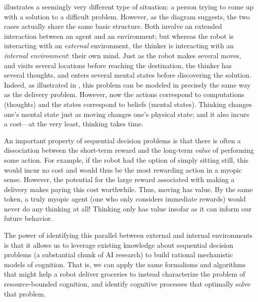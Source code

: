  illustrates a seemingly very different type of situation: a person trying to come up with a solution to a difficult problem. However, as the diagram suggests, the two cases actually share the same basic structure. Both involve an extended interaction between an agent and an environment; but whereas the robot is interacting with an \emph{external} environment, the thinker is interacting with an \emph{internal environment}: their own mind. Just as the robot makes several moves, and visits several locations before reaching the destination, the thinker has several thoughts, and enters several mental states before discovering the solution. Indeed, as illustrated in , this problem can be modeled in precisely the same way as the delivery problem. However, now the actions correspond to computations (thoughts) and the states correspond to beliefs (mental states). Thinking changes one's mental state just as moving changes one's physical state; and it also incurs a cost---at the very least, thinking takes time.

An important property of sequential decision problems is that there is often a dissociation between the short-term reward and the long-term \emph{value} of performing some action. For example, if the robot had the option of simply sitting still, this would incur no cost and would thus be the most rewarding action in a myopic sense. However, the potential for the large reward associated with making a delivery makes paying this cost worthwhile. Thus, moving has value. By the same token, a truly myopic agent (one who only considers immediate rewards) would never do any thinking at all! Thinking only has value insofar as it can inform our future behavior.\footnotemark{}


The power of identifying this parallel between external and internal environments is that it allows us to leverage existing knowledge about sequential decision problems (a substantial chunk of AI research) to build rational mechanistic models of cognition. That is, we can apply the same formalisms and algorithms that might help a robot deliver groceries to instead characterize the problem of resource-bounded cognition, and identify cognitive processes that optimally solve that problem.


